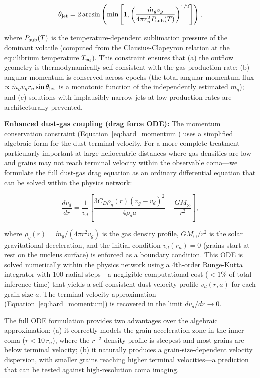 \documentclass[preprint2]{aastex631}
\begin{document}
\begin{equation}\label{eq:hard_angular}
\theta_{\rm jet} = 2 \arcsin\left(\min\left[1, \left(\frac{\dot{m}_g v_g}{4 \pi r_n^2 P_{\rm sub}(T)}\right)^{1/2}\right]\right),
\end{equation}

where $P_{\rm sub}(T)$ is the temperature-dependent sublimation pressure of the dominant volatile (computed from the Clausius-Clapeyron relation at the equilibrium temperature $T_{\rm eq}$). This constraint ensures that (a) the outflow geometry is thermodynamically self-consistent with the gas production rate; (b) angular momentum is conserved across epochs (the total angular momentum flux $\propto \dot{m}_g v_g r_n \sin\theta_{\rm jet}$ is a monotonic function of the independently estimated $\dot{m}_g$); and (c) solutions with implausibly narrow jets at low production rates are architecturally prevented.

\textbf{Enhanced dust-gas coupling (drag force ODE):} The momentum conservation constraint (Equation~\ref{eq:hard_momentum}) uses a simplified algebraic form for the dust terminal velocity. For a more complete treatment---particularly important at large heliocentric distances where gas densities are low and grains may not reach terminal velocity within the observable coma---we formulate the full dust-gas drag equation as an ordinary differential equation that can be solved within the physics network:

\begin{equation}\label{eq:dust_gas_ode}
\frac{d v_d}{d r} = \frac{1}{v_d}\left[\frac{3 C_D \rho_g(r) (v_g - v_d)^2}{4 \rho_d a} - \frac{G M_{\odot}}{r^2}\right],
\end{equation}

where $\rho_g(r) = \dot{m}_g / (4\pi r^2 v_g)$ is the gas density profile, $G M_{\odot}/r^2$ is the solar gravitational deceleration, and the initial condition $v_d(r_n) = 0$ (grains start at rest on the nucleus surface) is enforced as a boundary condition. This ODE is solved numerically within the physics network using a 4th-order Runge-Kutta integrator with 100 radial steps---a negligible computational cost ($<1$\% of total inference time) that yields a self-consistent dust velocity profile $v_d(r, a)$ for each grain size $a$. The terminal velocity approximation (Equation~\ref{eq:hard_momentum}) is recovered in the limit $d v_d / d r \rightarrow 0$.

The full ODE formulation provides two advantages over the algebraic approximation: (a) it correctly models the grain acceleration zone in the inner coma ($r < 10\,r_n$), where the $r^{-2}$ density profile is steepest and most grains are below terminal velocity; (b) it naturally produces a grain-size-dependent velocity dispersion, with smaller grains reaching higher terminal velocities---a prediction that can be tested against high-resolution coma imaging.
\end{document}
